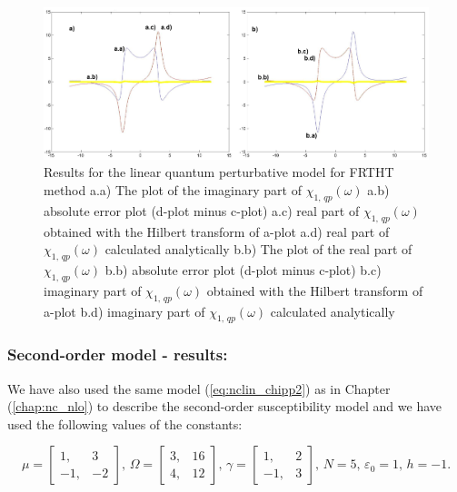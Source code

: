\documentclass[12pt,twoside,a4paper]{article}
\numberwithin{equation}{subsection}
\numberwithin{figure}{subsection}
\begin{document}
\begin{figure}
  \includegraphics[width=150mm]{img/fht_qp1.png}
  \caption{Results for the linear quantum perturbative model for FRTHT method
    a.a) The plot of the imaginary part of ${\chi_{1, \,qp}}(\omega )$
    a.b) absolute error plot (d-plot minus c-plot) 
    a.c) real part of $\chi_{1, \, qp} (\omega )$ obtained with the Hilbert transform of a-plot 
    a.d) real part of $\chi_{1, \, qp} (\omega )$ calculated analytically 
    b.b) The plot of the real part of $ \chi_{1, \, qp} (\omega )$ 
    b.b) absolute error plot (d-plot minus c-plot) 
    b.c) imaginary part of $\chi_{1, \, qp} (\omega )$ obtained with the Hilbert transform of a-plot 
    b.d) imaginary part of $\chi_{1, \, qp} (\omega )$ calculated analytically  
    \label{fig:fht_qp1}
  }
\end{figure}

\subsubsection*{Second-order model - results:}

We have also used the same model (\ref{eq:nclin_chipp2}) as in Chapter (\ref{chap:nc_nlo}) to describe the second-order susceptibility model and we have used the following values of the constants: 

\begin{equation}
	\mu = \begin{bmatrix} 
    	1, & 3 \\ -1, & -2 
  	\end{bmatrix} , \, 
  	\Omega =  \begin{bmatrix}  
    	3, & 16 \\ 4, & 12 
  	\end{bmatrix} , \,
  	\gamma =  \begin{bmatrix}  
  		1, & 2 \\ -1, & 3
  	\end{bmatrix} , \, 
  	N = 5 , \, 
  	\varepsilon_0 = 1, \,
  	h = - 1 .
\end{equation}
\end{document}
